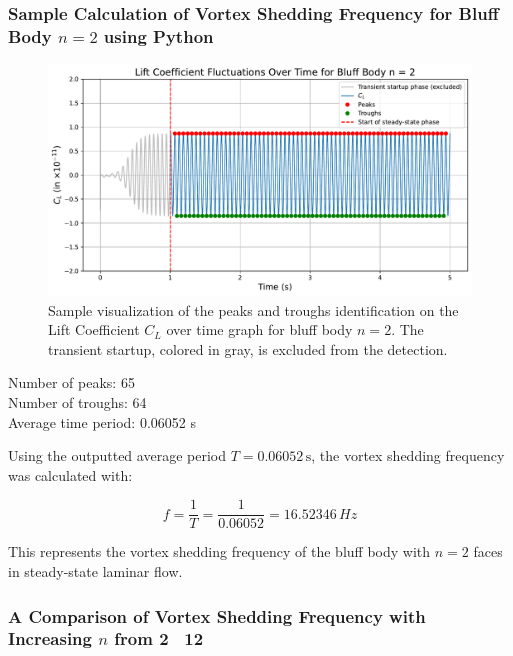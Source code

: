 \subsubsection{Sample Calculation of Vortex Shedding Frequency for Bluff Body $n=2$ using Python}

\begin{figure}[H]
	\centering
	\includegraphics[width=\textwidth]{images/2face_graph_sample_Calc}
	\caption{Sample visualization of the peaks and troughs identification on the Lift Coefficient $C_L$ over time graph for bluff body $n=2$. The transient startup, colored in gray, is excluded from the detection.}
	\label{fig:2FaceGraphSampleCalc} 
\end{figure}

\begin{tcolorbox}[title=Python Output,fonttitle=\bfseries,
	colframe=black!75!white,colback=gray!10!white,boxrule=0.5pt,
	fontupper=\ttfamily]
	Number of peaks:    65 \\
	Number of troughs:  64 \\
	
	Average time period: 0.06052 s \\
\end{tcolorbox}

Using the outputted average period \( T = 0.06052 \, \text{s} \), the vortex shedding frequency was calculated with:

\[
f = \frac{1}{T} = \frac{1}{0.06052} = 16.52346 \, Hz
\]

This represents the vortex shedding frequency of the bluff body with \( n = 2 \) faces in steady-state laminar flow.

\subsubsection{A Comparison of Vortex Shedding Frequency with Increasing $n$ from 2 \textendash\ 12}

